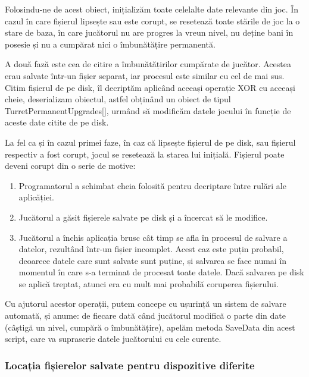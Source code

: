 \documentclass[12pt, a4paper]{article}
\begin{document}
	Folosindu-ne de acest obiect, inițializăm toate celelalte date relevante din joc. În cazul în care fișierul lipsește sau este corupt, se resetează toate stările de joc la o stare de baza, în care jucătorul nu are progres la vreun nivel, nu deține bani în posesie și nu a cumpărat nici o îmbunătățire permanentă.
	\newline
	
	A două fază este cea de citire a îmbunătățirilor cumpărate de jucător. Acestea erau salvate într-un fișier separat, iar procesul este similar cu cel de mai sus. Citim fișierul de pe disk, îl decriptăm aplicând aceeași operație XOR cu aceeași cheie, deserializam obiectul, astfel obținând un obiect de tipul TurretPermanentUpgrades[], urmând să modificăm datele jocului în funcție de aceste date citite de pe disk.
	\newline
	
	La fel ca și în cazul primei faze, în caz că lipsește fișierul de pe disk, sau fișierul respectiv a fost corupt, jocul se resetează la starea lui inițială. Fișierul poate deveni corupt din o serie de motive:
	
	\begin{enumerate}
		\item Programatorul a schimbat cheia folosită pentru decriptare între rulări ale aplicăției.
		\item Jucătorul a găsit fișierele salvate pe disk și a încercat să le modifice.
		\item Jucătorul a închis aplicația brusc cât timp se afla în procesul de salvare a datelor, rezultând într-un fișier incomplet. Acest caz este puțin probabil, deoarece datele care sunt salvate sunt puține, și salvarea se face numai în momentul în care s-a terminat de procesat toate datele. Dacă salvarea pe disk se aplică treptat, atunci era cu mult mai probabilă coruperea fișierului.
	\end{enumerate}
	
	Cu ajutorul acestor operații, putem concepe cu ușurință un sistem de salvare automată, și anume: de fiecare dată când jucătorul modifică o parte din date (câștigă un nivel, cumpără o îmbunătățire), apelăm metoda SaveData din acest script, care va suprascrie datele jucătorului cu cele curente.
	
	
	
	
	\subsubsection{Locația fișierelor salvate pentru dispozitive diferite}
	\label{section: androidSave}
	
\end{document}

